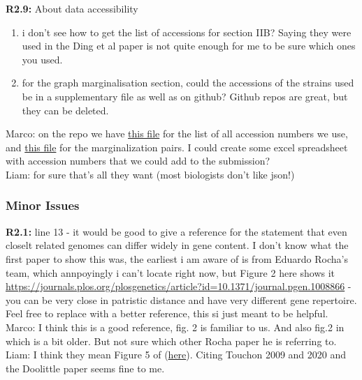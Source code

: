 \documentclass[aps,rmp,onecolumn]{revtex4-1}
\newcommand{\Marco}[1]{{\color{gray}Marco: #1}}
\newcommand{\Liam}[1]{{\color{teal}Liam: #1}}
\newcommand{\reviewer}[2]{\textbf{#1:} #2\vskip 5mm}
\begin{document}
\reviewer{R2.9}{About data accessibility
      \begin{enumerate}
            \item i don't see how to get the list of accessions for section IIB? Saying they were used in the Ding et al paper is not quite enough for me to be sure which ones you used.
            \item for the graph marginalisation section, could the accessions of the strains used be in a supplementary file as well as on github? Github repos are great, but they can be deleted.
      \end{enumerate}}
\Marco{on the repo we have \href{https://github.com/neherlab/pangraph/blob/master/script/config/accnums.json}{this file} for the list of all accession numbers we use, and \href{https://github.com/neherlab/pangraph/blob/master/script/config/projection_strains.json}{this file} for the marginalization pairs. I could create some excel spreadsheet with accession numbers that we could add to the submission?}\\
\Liam{for sure that's all they want (most biologists don't like json!)}

\subsubsection*{Minor Issues}

\reviewer{R2.1}{line 13 - it would be good to give a reference for the statement that even closelt related genomes can differ widely in gene content.
      I don't know what the first paper to show this was, the earliest i am aware of is from Eduardo Rocha's team, which annpoyingly i can't locate right now, but Figure 2 here shows it \url{https://journals.plos.org/plosgenetics/article?id=10.1371/journal.pgen.1008866} \cite{touchon2020phylogenetic} - you can be very close in patristic distance and have very different gene repertoire.
      Feel free to replace with a better reference, this si just meant to be helpful.}
\Marco{I think this is a good reference, fig. 2 is familiar to us. And also fig.2 in \cite{doolittle2009origin} which is a bit older. But not sure which other Rocha paper he is referring to.}\\
\Liam{I think they mean Figure 5 of \cite{touchon2009organised} (\href{https://journals.plos.org/plosgenetics/article?id=10.1371/journal.pgen.1000344}{here}). Citing Touchon 2009 and 2020 and the Doolittle paper seems fine to me.}
\end{document}
